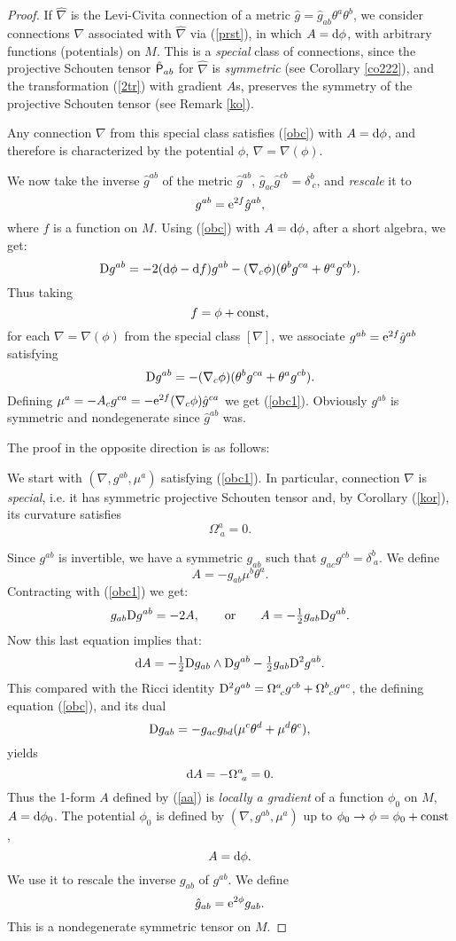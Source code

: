 \documentclass[letterpaper]{amsart}
\theoremstyle{definition}
\theoremstyle{remark}
\newcommand{\be}{\begin{equation}}
\newcommand{\ee}{\end{equation}}
\newcommand{\D}{{\rm D}}
\newcommand{\dz}{\wedge}
\newcommand{\der}{{\rm d}}
\newcommand{\Rho}{{\mbox{\sf P}}}
\begin{document}
\begin{proof}
If $\hat{\nabla}$ is the Levi-Civita connection of a metric
$\hat{g}=\hat{g}_{ab}\theta^a\theta^b$, we consider 
connections $\nabla$ associated with $\hat{\nabla}$ via (\ref{prst}),
in which $A=\der\phi$, with arbitrary functions (potentials) on
$M$. This is a \emph{special} class of connections, since the
projective Schouten tensor $\hat{\Rho}_{ab}$ for $\hat{\nabla}$ is 
\emph{symmetric} (see Corollary \ref{co222}), and the transformation
(\ref{2tr}) with gradient $A$s, preserves the symmetry of the
projective Schouten tensor (see Remark \ref{ko}). 

Any connection $\nabla$ from this special class satisfies (\ref{obc})
with $A=\der \phi$, and therefore is characterized by the potential
$\phi$, $\nabla=\nabla(\phi)$.
 
We now take the inverse $\hat{g}^{ab}$ of the metric $\hat{g}^{ab}$,
$\hat{g}_{ac}\hat{g}^{cb}=\delta^b_{~c}$, and \emph{rescale} it to 
$$g^{ab}={\rm e}^{2f}\hat{g}^{ab},$$
where $f$ is a function on $M$. Using (\ref{obc}) with $A=\der\phi$, after a short
algebra, we get: 
$$\D g^{ab}=-2(\der\phi-\der f)g^{ab}-(\nabla_c\phi)(\theta^bg^{ca}+\theta^ag^{cb}).$$ 
Thus taking $$f=\phi+ {\rm const},$$ for each $\nabla=\nabla(\phi)$
from the special class $[\nabla]$, we associate $g^{ab}={\rm
  e}^{2f}\hat{g}^{ab}$ satisfying 
$$\D g^{ab}=-(\nabla_c\phi)(\theta^bg^{ca}+\theta^ag^{cb}).$$ 
Defining $\mu^a=-A_c g^{ca}=-{\rm e}^{2f}(\nabla_c\phi)\hat{g}^{ca}$ we get
(\ref{obc1}). Obviously $g^{ab}$ is symmetric and nondegenerate since 
$\hat{g}^{ab}$ was. 

The proof in the opposite direction is as follows:

We start with $(\nabla,g^{ab},\mu^a)$ satisfying (\ref{obc1}). In
particular, connection $\nabla$ is \emph{special}, i.e. it has symmetric
projective Schouten tensor and, by Corollary (\ref{kor}), its curvature satisfies
$$\Omega^a_{~a}=0.$$ 

Since $g^{ab}$
is invertible, we have a symmetric $g_{ab}$ such that
$g_{ac}g^{cb}=\delta^b_{~a}$. We define 
\be
A=-g_{ab}\mu^b\theta^a.\label{aa}\ee
Contracting with (\ref{obc1}) we get:
$$g_{ab}\D g^{ab}=-2A,\quad\quad {\rm or}\quad\quad A=-\tfrac12
g_{ab}\D g^{ab}.$$
Now this last equation implies that:
$$\der A=-\tfrac12\D g_{ab}\dz\D g^{ab}-\tfrac12 g_{ab}\D^2 g^{ab}.$$
This compared with the Ricci identity $\D^2g^{ab}=\Omega^a_{~c}g^{cb}+\Omega^b_{~c}g^{ac}$, the defining equation 
(\ref{obc}), and its dual 
$$\D g_{ab}=-g_{ac}g_{bd}(\mu^c\theta^d+\mu^d\theta^c),$$
yields $$\der A=-\Omega^a_{~a}=0.$$
Thus the 1-form $A$ defined by (\ref{aa}) is \emph{locally a gradient}
of a function $\phi_0$ on $M$, $A=\der\phi_0$.  
The potential $\phi_0$ is defined by $(\nabla,g^{ab},\mu^a)$ up to
$\phi_0\to\phi=\phi_0+{\rm const}$, $$A=\der\phi.$$ 
We use it to rescale the inverse 
$g_{ab}$ of $g^{ab}$. We define 
$$\hat{g}_{ab}={\rm e}^{2\phi}g_{ab}.$$
This is a nondegenerate symmetric tensor on $M$. 


\end{proof}
\end{document}
